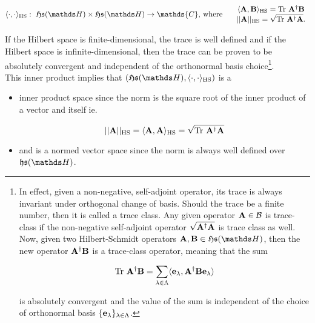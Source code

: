 \documentclass{homework}
\begin{document}
\begin{align*}
\langle \cdot , \cdot \rangle_{\textnormal{HS}}: \blanky \mathfrak{H}\mathfrak{s}(\hilbert) \times \mathfrak{H}\mathfrak{s}(\hilbert) \rightarrow \mathds{C}, & \textnormal{ where } &
    \begin{array}{c} 
         \langle {\bf A}, {\bf B} \rangle_{\textnormal{HS}} = \textnormal{Tr } \bf A^\dagger {\bf B} \\
         ||{\bf A}||_{\textnormal{HS}} = \sqrt{\textnormal{Tr } \bf A^\dagger {\bf A}}.
    \end{array}
\end{align*}

If the Hilbert space is finite-dimensional, the trace is well defined and if the Hilbert space is infinite-dimensional, then the trace can be proven to be absolutely convergent and independent of the orthonormal basis choice\footnote{In effect, given a non-negative, self-adjoint operator, its trace is always invariant under orthogonal change of basis. Should the trace be a finite number, then it is called a trace class. Any given operator ${\bf A} \in \mathcal{B}$ is trace-class if the non-negative self-adjoint operator $\sqrt{{\bf A^\dagger} {\bf A}}$ is trace class as well. Now, given two Hilbert-Schmidt operators ${\bf A}, {\bf B} \in \mathfrak{H}\mathfrak{s}(\hilbert)$, then the new operator $\bf A^\dagger{\bf B}$ is a trace-class operator, meaning that the sum 

$$
\textnormal{Tr } {\bf A^\dagger}{\bf B} = \sum_{\lambda \in \Lambda} \langle {\bf e}_{\lambda}, {\bf A}^\dagger {\bf B} {\bf e}_{\lambda} \rangle 
$$

is absolutely convergent and the value of the sum is independent of the choice of orthonormal basis $\{{\bf e}_{\lambda}\}_{\lambda \in \Lambda}$. 
}. \\

This inner product implies that $(\mathfrak{H}\mathfrak{s}(\hilbert), \langle \cdot , \cdot \rangle_{\textnormal{HS}})$ is a

\begin{itemize}
    \item inner product space since the norm is the square root of the inner product of a vector and itself ie.
    
    $$
    ||{\bf A}||_{\textnormal{HS}} = \langle {\bf A} , {\bf A} \rangle_{\textnormal{HS}} = \sqrt{\textnormal{Tr } \bf A^\dagger {\bf A}}
    $$
    
    \item and is a normed vector space since the norm is always well defined over $\mathfrak{h}\mathfrak{s}(\hilbert)$. 
\end{itemize}
\end{document}
